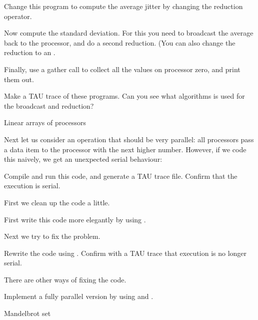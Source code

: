\begin{exercise}
  Change this program to compute the average jitter by changing the reduction
  operator.
\end{exercise}

\begin{exercise}
  Now compute the standard deviation. For this you need to broadcast
  the average back to the processor, and do a second reduction. (You
  can also change the reduction to an .
\end{exercise}

\begin{exercise}
  Finally, use a gather call to collect all the values on processor zero,
  and print them out.
\end{exercise}

\begin{istc}
\begin{exercise}
  Make a TAU trace of these programs. Can you see what algorithms is
  used for the broadcast and reduction?
\end{exercise}
\end{istc}

 {Linear arrays of processors}

Next let us consider an operation that should be very parallel: all
processors pass a data item to the processor with the next higher
number. However, if we code this naively, we get an unexpected serial
behaviour:

\begin{exercise}
  Compile and run this code, and generate a TAU trace file. Confirm
  that the execution is serial.
\end{exercise}
First we clean up the code a little.
\begin{exercise}
  First write this code more elegantly by using .
\end{exercise}
Next we try to fix the problem.
\begin{exercise}
  Rewrite the code using . Confirm with a TAU trace
  that execution is no longer serial.
\end{exercise}
There are other ways of fixing the code.
\begin{exercise}
  Implement a fully parallel version by using  and
  .
\end{exercise}

 {Mandelbrot set}

